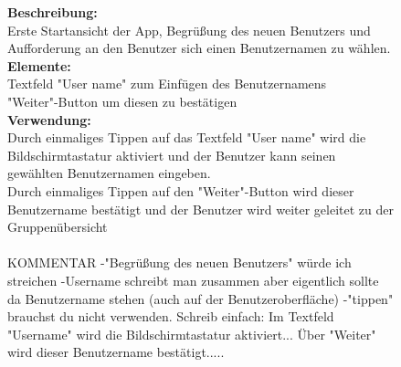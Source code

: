 \begin{figure} [H]
{	\textbf{Beschreibung:}\\
	Erste Startansicht der App, Begrüßung des neuen Benutzers und Aufforderung an den Benutzer sich einen Benutzernamen zu wählen.\\
	\textbf{Elemente:}\\
	Textfeld "User name" zum Einfügen des Benutzernamens\\
	"Weiter"-Button um diesen zu bestätigen\\
	\textbf{Verwendung:}\\
	Durch einmaliges Tippen auf das Textfeld "User name" wird die Bildschirmtastatur aktiviert und der Benutzer kann seinen gewählten Benutzernamen eingeben.\\
	Durch einmaliges Tippen auf den "Weiter"-Button wird dieser Benutzername bestätigt und der Benutzer wird weiter geleitet zu der Gruppenübersicht\\ \\
	
	KOMMENTAR
	-"Begrüßung des neuen Benutzers" würde ich streichen
	-Username schreibt man zusammen aber eigentlich sollte da Benutzername stehen (auch auf der Benutzeroberfläche)
	-"tippen" brauchst du nicht verwenden. Schreib einfach: Im Textfeld "Username" wird die Bildschirmtastatur aktiviert...
															Über "Weiter"  wird dieser Benutzername bestätigt..... 
	
}
\end{figure}

